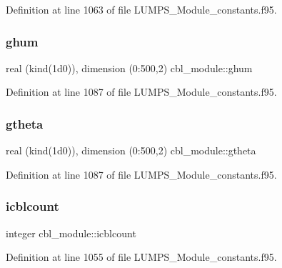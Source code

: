 Definition at line 1063 of file L\+U\+M\+P\+S\+\_\+\+Module\+\_\+constants.\+f95.

\mbox{\label{namespacecbl__module_a2c8e164b18520600e084ab16825b7996}} 
\subsubsection{\texorpdfstring{ghum}{ghum}}
{\footnotesize\ttfamily real (kind(1d0)), dimension (0\+:500,2) cbl\+\_\+module\+::ghum}



Definition at line 1087 of file L\+U\+M\+P\+S\+\_\+\+Module\+\_\+constants.\+f95.

\mbox{\label{namespacecbl__module_aa6c88eb40ac8bd6e5a7df04080288218}} 
\subsubsection{\texorpdfstring{gtheta}{gtheta}}
{\footnotesize\ttfamily real (kind(1d0)), dimension (0\+:500,2) cbl\+\_\+module\+::gtheta}



Definition at line 1087 of file L\+U\+M\+P\+S\+\_\+\+Module\+\_\+constants.\+f95.

\mbox{\label{namespacecbl__module_a105bb269b58c37d9b6170f7aa3a74fbe}} 
\subsubsection{\texorpdfstring{icblcount}{icblcount}}
{\footnotesize\ttfamily integer cbl\+\_\+module\+::icblcount}



Definition at line 1055 of file L\+U\+M\+P\+S\+\_\+\+Module\+\_\+constants.\+f95.

\mbox{\label{namespacecbl__module_ae82d92a08db006da8495afa687a74c6c}} 
